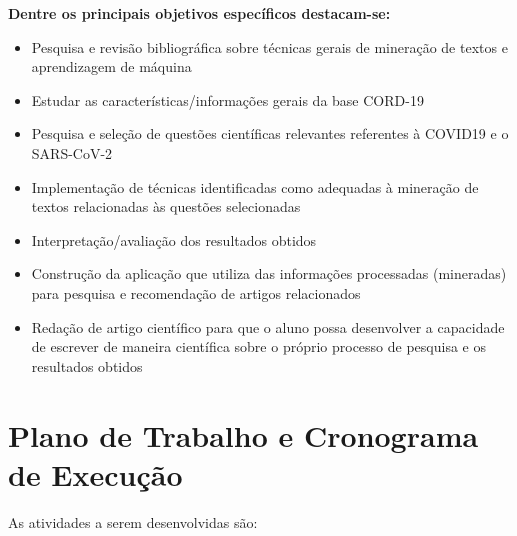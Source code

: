 \documentclass[
	12pt,				%
	a4paper,			%
	english,			%
	brazil,				%
	]{article}
\begin{document}
{\bf Dentre os principais objetivos espec\' ificos destacam-se: }
\begin{itemize}
\item Pesquisa e revis\~ ao bibliogr\' afica sobre t\' ecnicas gerais de minera\c c\~ ao de textos e aprendizagem de m\' aquina
\item Estudar as caracter\' isticas/informa\c c\~ oes gerais da base CORD-19
\item Pesquisa e sele\c c\~ ao de quest\~ oes cient\' ificas relevantes referentes à COVID19 e o SARS-CoV-2
\item Implementa\c c\~ ao de t\' ecnicas identificadas como adequadas à minera\c c\~ ao de
textos relacionadas às quest\~ oes selecionadas
\item Interpreta\c c\~ ao/avalia\c c\~ ao dos resultados obtidos
\item Constru{\c c}\~ ao da aplica{\c c}\~ ao que utiliza das informa{\c c}\~ oes processadas (mineradas) para pesquisa  e recomenda{\c c}\~ ao de artigos relacionados
\item Reda\c c\~ ao de artigo cient\' ifico para que o aluno possa desenvolver a
capacidade de escrever de maneira cient\' ifica sobre o pr\' oprio processo de
pesquisa e os resultados obtidos
\end{itemize}



    	
\section{Plano de Trabalho e Cronograma de Execu\c c\~ ao}
	
    As atividades a serem desenvolvidas s\~ ao:
\end{document}

